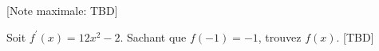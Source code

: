 \begin{question}
  \hspace*{\fill} [Note maximale: TBD]\par
  \medskip
  \noindent Soit $f^\prime(x) = 12x^2 - 2$.  Sachant que $f(-1) = -1$, trouvez $f(x)$.\hspace*{\fill} [TBD]\par
\end{question}
